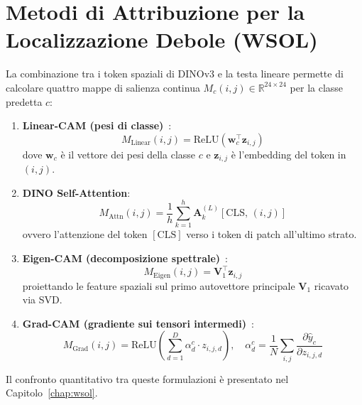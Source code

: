 \section{Metodi di Attribuzione per la Localizzazione Debole (WSOL)}
\label{sec:arch_wsol_cenni}
La combinazione tra i token spaziali di DINOv3 e la testa lineare permette di calcolare quattro mappe di salienza continua $M_c(i, j) \in \mathbb{R}^{24 \times 24}$ per la classe predetta $c$:
\begin{enumerate}
    \item \textbf{Linear-CAM (pesi di classe)}~\cite{zhou2016learning}:
    \begin{equation}
        M_{\text{Linear}}(i, j) = \text{ReLU}\left( \mathbf{w}_c^\top \mathbf{z}_{i, j} \right)
    \end{equation}
    dove $\mathbf{w}_c$ è il vettore dei pesi della classe $c$ e $\mathbf{z}_{i, j}$ è l'embedding del token in $(i, j)$.
    \item \textbf{DINO Self-Attention}:
    \begin{equation}
        M_{\text{Attn}}(i, j) = \frac{1}{h} \sum_{k=1}^h \mathbf{A}_{k}^{(L)}[\text{CLS}, \, (i, j)]
    \end{equation}
    ovvero l'attenzione del token $[\text{CLS}]$ verso i token di patch all'ultimo strato.
    \item \textbf{Eigen-CAM (decomposizione spettrale)}~\cite{muhammad2020eigen}:
    \begin{equation}
        M_{\text{Eigen}}(i, j) = \mathbf{V}_1^\top \mathbf{z}_{i, j}
    \end{equation}
    proiettando le feature spaziali sul primo autovettore principale $\mathbf{V}_1$ ricavato via SVD.
    \item \textbf{Grad-CAM (gradiente sui tensori intermedi)}~\cite{selvaraju2017grad}:
    \begin{equation}
        M_{\text{Grad}}(i, j) = \text{ReLU}\left( \sum_{d=1}^D \alpha_d^c \cdot z_{i, j, d} \right), \quad \alpha_d^c = \frac{1}{N} \sum_{i, j} \frac{\partial \hat{y}_c}{\partial z_{i, j, d}}
    \end{equation}
\end{enumerate}
Il confronto quantitativo tra queste formulazioni è presentato nel Capitolo~\ref{chap:wsol}.
